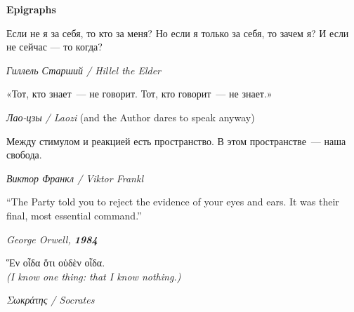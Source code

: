 \documentclass[11pt,a4paper]{article}
\theoremstyle{definition}
\theoremstyle{remark}
\begin{document}
\author{
  \textbf{Dr.\ Artiom ``Коваль'' Kovnatsky}\\
  \small AK-Human-0 \;|\; Ольшанець 69 \;|\; Mykolaiv, Ukraine / Berlin, Germany\\
  \small \href{https://github.com/skovnats/SVE}{github.com/skovnats/SVE}
  \;\;|\;\;
  \href{https://zenodo.org}{Zenodo Preprint}\\
  \small \textit{Soli Deo Gloria \;|\; \foreignlanguage{russian}{С Богом!}
  \;|\; Mit Gott! \;|\; With God!}
}

\date{
  \small February 2026 \;|\; Berlin\\
  \small \textit{PFP Initiative: 11.11.2026 / 11:11 CET}\\[0.2cm]
  {\footnotesize\color{subtitlecolor}
    Preprint v2.0 --- Integrated Manifest Edition}
}

\maketitle
\thispagestyle{empty}
\newpage


\begin{center}
{\large\color{titlecolor}\textbf{Epigraphs}}
\end{center}
\vspace{0.3cm}

\epigraph{
  \foreignlanguage{russian}{Если не я за себя, то кто за меня?
  Но если я только за себя, то зачем я?
  И если не сейчас — то когда?}
}{\textit{Гиллель Старший / Hillel the Elder}}

\epigraph{
  \foreignlanguage{russian}{«Тот, кто знает~--- не говорит.
  Тот, кто говорит~--- не знает.»}
}{\textit{Лао-цзы / Laozi} \quad \small(and the Author dares to speak anyway)}

\epigraph{
  \foreignlanguage{russian}{Между стимулом и реакцией есть пространство.
  В этом пространстве~--- наша свобода.}
}{\textit{Виктор Франкл / Viktor Frankl}}

\epigraph{
  ``The Party told you to reject the evidence of your eyes and ears.
  It was their final, most essential command.''
}{\textit{George Orwell, \textbf{1984}}}

\epigraph{
  \foreignlanguage{greek}{Ἓν οἶδα ὅτι οὐδὲν οἶδα.}\\
  \small\textit{(I know one thing: that I know nothing.)}
}{\textit{\foreignlanguage{greek}{Σωκράτης} / Socrates}}
\end{document}
